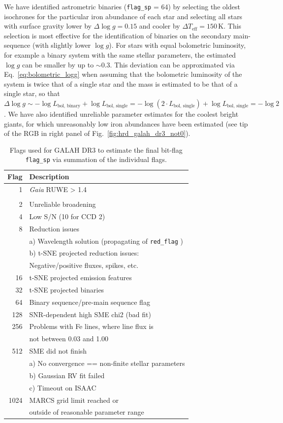 \documentclass[fleqn,usenatbib,useAMS]{mnras}
\newcommand{\Gaia}{\textit{Gaia}\xspace}
\begin{document}
We have identified astrometric binaries (\texttt{flag\_sp} = 64) by selecting the oldest isochrones for the particular iron abundance of each star and selecting all stars with surface gravity lower by $\Delta \log g = 0.15$ and cooler by $\Delta T_\text{eff} = 150\,\mathrm{K}$. This selection is most effective for the identification of binaries on the secondary main-sequence (with slightly lower $\log g$). For stars with equal bolometric luminosity, for example a binary system with the same stellar parameters, the estimated $\log g$ can be smaller by up to $\sim 0.3$. This deviation can be approximated via Eq.~\ref{eq:bolometric_logg} when assuming that the bolometric luminosity of the system is twice that of a single star and the mass is estimated to be that of a single star, so that $\Delta \log g \sim - \log L_\text{bol, binary} + \log L_\text{bol, single} = - \log \left( 2 \cdot L_\text{bol, single} \right) + \log L_\text{bol, single} = - \log 2 $. We have also identified unreliable parameter estimates for the coolest bright giants, for which unreasonably low iron abundances have been estimated (see tip of the RGB in right panel of Fig.~\ref{fig:hrd_galah_dr3_not0}).

\begin{table}
 \caption{Flags used for GALAH DR3 to estimate the final bit-flag \texttt{flag\_sp} via summation of the individual flags.}
 \label{tab:flag_sp_galah_dr3}
 \begin{tabular}{rl}
  \hline \hline
Flag		&	Description	\\
\hline
   1	&	\Gaia RUWE > 1.4 \\
   	&	\citep[bad astrometric solution, see][]{Lindegren2018b} \\
   2	&	Unreliable broadening \\
   4	&	Low S/N (10 for CCD 2) \\
   8	&	Reduction issues \\
	&	a) Wavelength solution (propagating of \texttt{red\_flag} ) \\
	&	b) t-SNE projected reduction issues: \\
	&	Negative/positive fluxes, spikes, etc. \\
  16	&	t-SNE projected emission features \\
  32	&	t-SNE projected binaries \\
  64	&	Binary sequence/pre-main sequence flag \\
 128	&	SNR-dependent high SME chi2 (bad fit) \\
 256	&	Problems with Fe lines, where line flux is \\
 	&	not between 0.03 and 1.00 \\
 512	&	SME did not finish \\
     	&	a) No convergence == non-finite stellar parameters \\
   	&	b) Gaussian RV fit failed \\
     	&	c) Timeout on ISAAC \\
1024	&	MARCS grid limit reached or \\
	&	outside of reasonable parameter range \\
  \hline
 \end{tabular}
\end{table}
\end{document}
